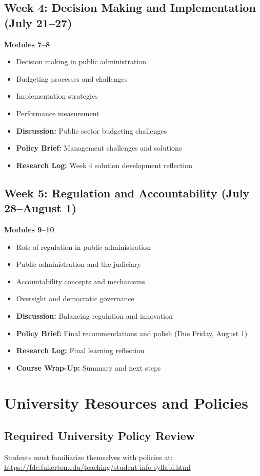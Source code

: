 \documentclass[11pt]{scrartcl} %
\begin{document}
\subsection{Week 4: Decision Making and Implementation (July 21--27)}
\textbf{Modules 7--8}
\begin{itemize}
\item Decision making in public administration
\item Budgeting processes and challenges
\item Implementation strategies
\item Performance measurement
\item \textbf{Discussion:} Public sector budgeting challenges
\item \textbf{Policy Brief:} Management challenges and solutions
\item \textbf{Research Log:} Week 4 solution development reflection
\end{itemize}

\subsection{Week 5: Regulation and Accountability (July 28--August 1)}
\textbf{Modules 9--10}
\begin{itemize}
\item Role of regulation in public administration
\item Public administration and the judiciary
\item Accountability concepts and mechanisms
\item Oversight and democratic governance
\item \textbf{Discussion:} Balancing regulation and innovation
\item \textbf{Policy Brief:} Final recommendations and polish (Due Friday, August 1)
\item \textbf{Research Log:} Final learning reflection
\item \textbf{Course Wrap-Up:} Summary and next steps
\end{itemize}

\section{University Resources and Policies}

\subsection{Required University Policy Review}
Students must familiarize themselves with policies at: \\
\url{https://fdc.fullerton.edu/teaching/student-info-syllabi.html}
\end{document}
